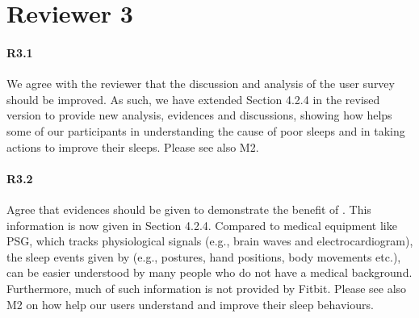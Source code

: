 \section*{Reviewer 3}
\paragraph{R3.1} We agree with the reviewer that the discussion and analysis of the user survey should be improved. As such, we have extended Section 4.2.4
in the revised version to provide new analysis, evidences and discussions, showing how \systemname helps some of our participants in
understanding the cause of poor sleeps and in taking actions to improve their sleeps. Please see also M2.

\paragraph{R3.2} Agree that evidences should be given to demonstrate the benefit of \systemname. This information is now given in Section
4.2.4. Compared to medical equipment like PSG, which tracks physiological signals (e.g., brain waves and electrocardiogram), the sleep
events given by \systemname (e.g., postures, hand positions, body movements etc.), can be easier understood by many people who do not have
a medical background. Furthermore, much of such information is not provided by Fitbit. Please see also M2 on how \systemname help our users
understand and improve their sleep behaviours.
